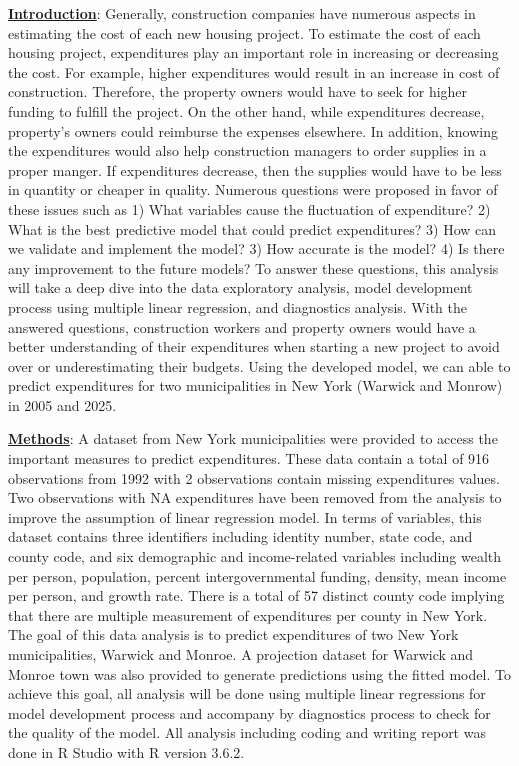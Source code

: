 \documentclass[11pt]{article}\usepackage[]{graphicx}\usepackage[]{color}
\begin{document}
\noindent\textbf{\underline{Introduction}}: Generally, construction companies have numerous aspects in estimating the cost of each new housing project. To estimate the cost of each housing project, expenditures play an important role in increasing or decreasing the cost. For example, higher expenditures would result in an increase in cost of construction. Therefore, the property owners would have to seek for higher funding to fulfill the project. On the other hand, while expenditures decrease, property’s owners could reimburse the expenses elsewhere. In addition, knowing the expenditures would also help construction managers to order supplies in a proper manger. If expenditures decrease, then the supplies would have to be less in quantity or cheaper in quality. Numerous questions were proposed in favor of these issues such as 1) What variables cause the fluctuation of expenditure? 2) What is the best predictive model that could predict expenditures? 3) How can we validate and implement the model? 3) How accurate is the model? 4) Is there any improvement to the future models? To answer these questions, this analysis will take a deep dive into the data exploratory analysis, model development process using multiple linear regression, and diagnostics analysis. With the answered questions, construction workers and property owners would have a better understanding of their expenditures when starting a new project to avoid over or underestimating their budgets. Using the developed model, we can able to predict expenditures for two municipalities in New York (Warwick and Monrow) in 2005 and 2025. 
\hfill \break

\noindent\textbf{\underline{Methods}}: A dataset from New York municipalities were provided to access the important measures to predict expenditures. These data contain a total of 916 observations from 1992 with 2 observations contain missing expenditures values. Two observations with NA expenditures have been removed from the analysis to improve the assumption of linear regression model. In terms of variables, this dataset contains three identifiers including identity number, state code, and county code, and six demographic and income-related variables including wealth per person, population, percent intergovernmental funding, density, mean income per person, and growth rate. There is a total of 57 distinct county code implying that there are multiple measurement of expenditures per county in New York. The goal of this data analysis is to predict expenditures of two New York municipalities, Warwick and Monroe. A projection dataset for Warwick and Monroe town was also provided to generate predictions using the fitted model. To achieve this goal, all analysis will be done using multiple linear regressions for model development process and accompany by diagnostics process to check for the quality of the model. All analysis including coding and writing report was done in R Studio with R version 3.6.2.     
\hfill \break
\end{document}
